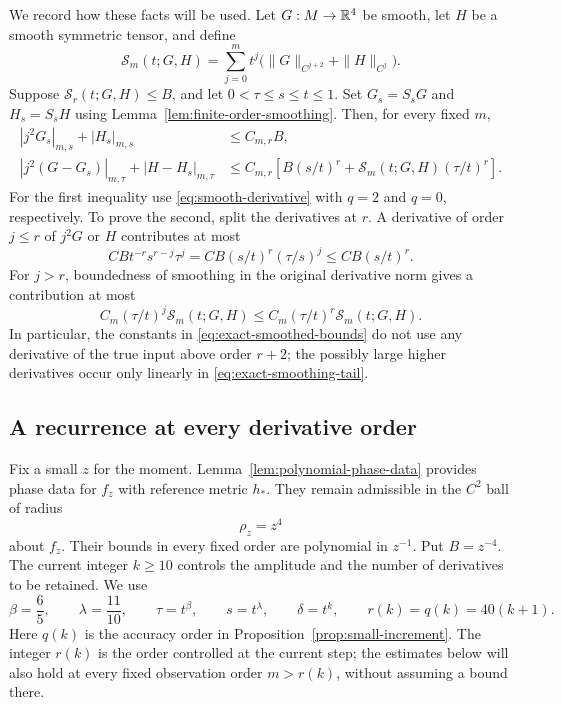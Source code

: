 We record how these facts will be used.  Let $G:M\to\mathbb{R}^4$ be smooth,
let $H$ be a smooth symmetric tensor, and define
\begin{equation}\label{eq:exact-weighted-input}
 \mathcal S_m(t;G,H)=
 \sum_{j=0}^m t^j\bigl(\|G\|_{C^{j+2}}+\|H\|_{C^j}\bigr).
\end{equation}
Suppose $\mathcal S_r(t;G,H)\le B$, and let
$0<\tau\le s\le t\le1$.  Set $G_s=S_sG$ and $H_s=S_sH$ using
Lemma~\ref{lem:finite-order-smoothing}.  Then, for every fixed $m$,
\begin{align}
 |j^2G_s|_{m,s}+|H_s|_{m,s}&\le C_{m,r}B,
 \label{eq:exact-smoothed-bounds}\\
 |j^2(G-G_s)|_{m,\tau}+|H-H_s|_{m,\tau}
 &\le C_{m,r}\left[
 B(s/t)^r+\mathcal S_m(t;G,H)(\tau/t)^r\right].
 \label{eq:exact-smoothing-tail}
\end{align}
For the first inequality use \eqref{eq:smooth-derivative} with $q=2$
and $q=0$, respectively.  To prove the second, split the derivatives
at $r$.  A derivative of order $j\le r$ of $j^2G$ or $H$ contributes
at most
\[
 C B t^{-r}s^{r-j}\tau^j
 =C B(s/t)^r(\tau/s)^j
 \le C B(s/t)^r.
\]
For $j>r$, boundedness of smoothing in the original derivative norm
gives a contribution at most
\[
 C_m(\tau/t)^j\mathcal S_m(t;G,H)
 \le C_m(\tau/t)^r\mathcal S_m(t;G,H).
\]
In particular, the constants in \eqref{eq:exact-smoothed-bounds} do
not use any derivative of the true input above order $r+2$; the
possibly large higher derivatives occur only linearly in
\eqref{eq:exact-smoothing-tail}.

\subsection{A recurrence at every derivative order}

Fix a small $z$ for the moment.  Lemma~\ref{lem:polynomial-phase-data}
provides phase data for $f_z$ with reference metric $h_*$.  They remain
admissible in the $C^2$ ball of radius
\[
 \rho_z=z^4
\]
about $f_z$.  Their bounds in every fixed order are polynomial in
$z^{-1}$.  Put $B=z^{-4}$.  The current integer $k\ge10$ controls the
amplitude and the number of derivatives to be retained.  We use
\begin{equation}\label{eq:exact-scales}
 \beta=\frac65,\qquad \lambda=\frac{11}{10},\qquad
 \tau=t^\beta,\qquad s=t^\lambda,\qquad
 \delta=t^k,\qquad r(k)=q(k)=40(k+1).
\end{equation}
Here $q(k)$ is the accuracy order in
Proposition~\ref{prop:small-increment}.  The integer $r(k)$ is the
order controlled at the current step; the estimates below will also hold
at every fixed observation order $m>r(k)$, without assuming a bound there.

